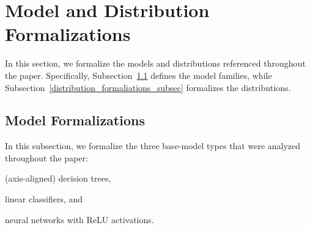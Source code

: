 \documentclass{article}
\begin{document}


\section{Model and Distribution Formalizations}
\label{models_and_distributions_app}

In this section, we formalize the models and distributions referenced throughout the paper. Specifically, Subsection~\ref{model_formaliations_subsec} defines the model families, while Subsection~\ref{distribution_formaliations_subsec} formalizes the distributions.


\subsection{Model Formalizations}
\label{model_formaliations_subsec}

In this subsection, we formalize the three base-model types that were analyzed throughout the paper: \begin{inparaenum}[(i)] \item (axis-aligned) decision trees, \item linear classifiers, and \item neural networks with ReLU activations.
\end{inparaenum} %
\end{document}

